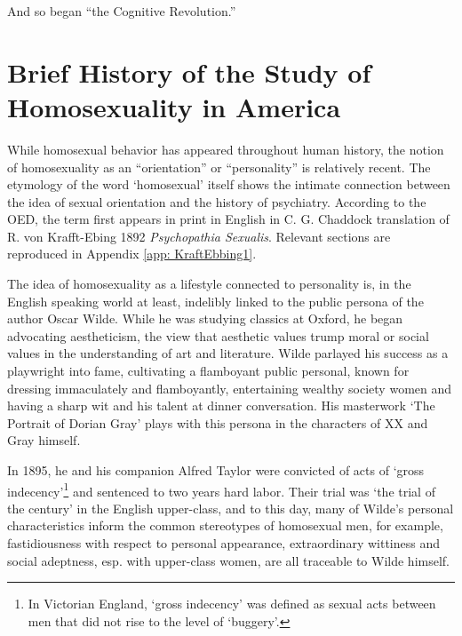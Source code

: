 \begin{refsection}
And so began ``the Cognitive Revolution.''

\section{Brief History of the Study of Homosexuality in America}
\label{briefhistoryofthestudyofhomosexualityinamerica}

While homosexual behavior has appeared throughout human history, the notion of homosexuality as an ``orientation'' or ``personality'' is relatively recent. The etymology of the word `homosexual' itself shows the intimate connection between the idea of sexual orientation and the history of psychiatry. According to the OED, the term first appears in print in English in C. G. Chaddock translation of R. von Krafft-Ebing 1892 \emph{Psychopathia Sexualis}. Relevant sections are reproduced in Appendix \ref{app: KraftEbbing1}.

The idea of homosexuality as a lifestyle connected to personality is, in the English speaking world at least, indelibly linked to the public persona of the author Oscar Wilde. While he was studying classics at Oxford, he began advocating aestheticism, the view that aesthetic values trump moral or social values in the understanding of art and literature. Wilde parlayed his success as a playwright into fame, cultivating a flamboyant public personal, known for dressing immaculately and flamboyantly, entertaining wealthy society women and having a sharp wit and his talent at dinner conversation. His masterwork `The Portrait of Dorian Gray' plays with this persona in the characters of XX and Gray himself.

In 1895, he and his companion Alfred Taylor were convicted of acts of `gross indecency'\footnote{In Victorian England, `gross indecency' was defined as sexual acts between men that did not rise to the level of `buggery'.} and sentenced to two years hard labor. Their trial was `the trial of the century' in the English upper-class, and to this day, many of Wilde's personal characteristics inform the common stereotypes of homosexual men, for example, fastidiousness with respect to personal appearance, extraordinary wittiness and social adeptness, esp. with upper-class women, are all traceable to Wilde himself.


\end{refsection}
